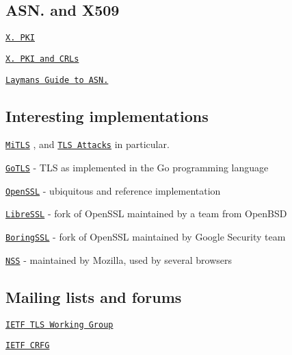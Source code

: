 \subsection*{A\+S\+N. and X509}


\begin{DoxyItemize}
\item \href{https://tools.ietf.org/html/rfc4210}{\tt X. P\+KI}
\item \href{https://tools.ietf.org/html/rfc5280}{\tt X. P\+KI and C\+R\+Ls}
\item \href{http://luca.ntop.org/Teaching/Appunti/asn1.html}{\tt Layman\textquotesingle{}s Guide to A\+S\+N.}
\end{DoxyItemize}

\subsection*{Interesting implementations}


\begin{DoxyItemize}
\item \href{http://www.mitls.org/wsgi/home}{\tt Mi\+T\+LS} , and \href{http://www.mitls.org/wsgi/tls-attacks}{\tt T\+LS Attacks} in particular.
\item \href{http://golang.org/pkg/crypto/tls/}{\tt Go\+T\+LS} -\/ T\+LS as implemented in the Go programming language
\item \href{https://www.openssl.org/}{\tt Open\+S\+SL} -\/ ubiquitous and reference implementation
\item \href{http://www.libressl.org/}{\tt Libre\+S\+SL} -\/ fork of Open\+S\+SL maintained by a team from Open\+B\+SD
\item \href{https://boringssl.googlesource.com/boringssl/}{\tt Boring\+S\+SL} -\/ fork of Open\+S\+SL maintained by Google Security team
\item \href{https://developer.mozilla.org/en-US/docs/Mozilla/Projects/NSS}{\tt N\+SS} -\/ maintained by Mozilla, used by several browsers
\end{DoxyItemize}

\subsection*{Mailing lists and forums}


\begin{DoxyItemize}
\item \href{https://datatracker.ietf.org/wg/tls/charter/}{\tt I\+E\+TF T\+LS Working Group}
\item \href{http://www.ietf.org/mail-archive/web/cfrg/current/maillist.html}{\tt I\+E\+TF C\+R\+FG}
\end{DoxyItemize}

